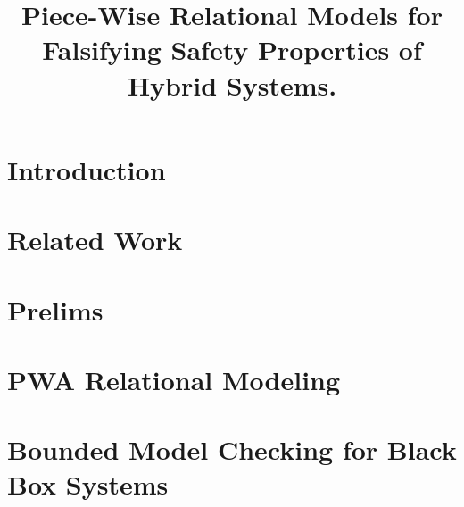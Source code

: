 \documentclass{sig-alternate}
\begin{document}



\title{Piece-Wise Relational Models for \\ Falsifying Safety
Properties of Hybrid Systems.
}





\maketitle

\begin{abstract}
  
\end{abstract}


\section{Introduction}
\label{sec:intro}



\section{Related Work}
\label{sec:rel}


\section{Prelims}
\label{sec:prelims}


\section{PWA Relational Modeling}
\label{sec:pwa-rel}


\section{Bounded Model Checking for Black Box Systems}
\label{sec:bmc}

\end{document}
